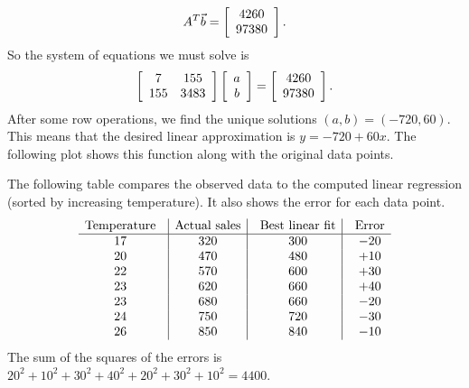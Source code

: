 \documentclass{ximera}
\begin{document}
\begin{solution}
\begin{equation*}
    A^T\vect{b} =
    \startmat{c}
      4260 \\
      97380
    \stopmat.
\end{equation*}
So the system of equations we must solve is
\begin{equation*}
    \startmat{cc}
      7 & 155 \\
      155 & 3483
    \stopmat
    \startmat{c} a \\ b \stopmat
    =
    \startmat{c}
      4260 \\
      97380
    \stopmat.
\end{equation*}
  After some row operations, we find the unique solutions
  $(a,b)=(-720,60)$. This means that the desired linear approximation
  is $y=-720 + 60x$. The following plot shows this function along with
  the original data points.
  \begin{center}
  \end{center}
  The following table compares the observed data to the computed
  linear regression (sorted by increasing temperature). It also shows
  the error for each data point.
  \begin{equation*}
    \begin{array}{c@{~~~}|c|@{~~~}c|@{~~~}c}
      \mbox{Temperature} & \mbox{Actual sales} & \mbox{Best linear fit} & \mbox{Error}\\\hline
      17 & 320 & 300 & -20 \\
      20 & 470 & 480 & +10 \\
      22 & 570 & 600 & +30 \\
      23 & 620 & 660 & +40 \\
      23 & 680 & 660 & -20 \\
      24 & 750 & 720 & -30 \\
      26 & 850 & 840 & -10 \\
    \end{array}
  \end{equation*}
  The sum of the squares of the errors is $20^2 + 10^2 + 30^2 + 40^2 + 20^2 + 30^2 + 10^2 = 4400$.
\end{solution}
\end{document}
